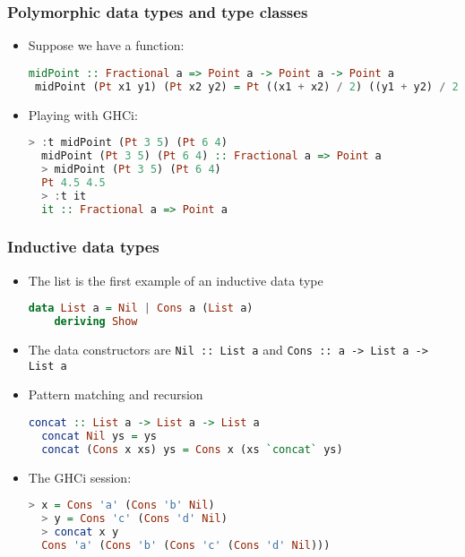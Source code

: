 \documentclass[10pt,pdf,utf8,russian,aspectratio=169]{beamer}
\begin{document}
\begin{frame}[fragile]
  \frametitle{Polymorphic data types and type classes}

\begin{itemize}
  \item Suppose we have a function:

  \begin{lstlisting}[language=Haskell]
 midPoint :: Fractional a => Point a -> Point a -> Point a
 midPoint (Pt x1 y1) (Pt x2 y2) = Pt ((x1 + x2) / 2) ((y1 + y2) / 2)
  \end{lstlisting}
  \item Playing with GHCi:
  \begin{lstlisting}[language=Haskell]
  > :t midPoint (Pt 3 5) (Pt 6 4)
  midPoint (Pt 3 5) (Pt 6 4) :: Fractional a => Point a
  > midPoint (Pt 3 5) (Pt 6 4)
  Pt 4.5 4.5
  > :t it
  it :: Fractional a => Point a
  \end{lstlisting}
\end{itemize}
\end{frame}

\begin{frame}[fragile]
  \frametitle{Inductive data types}

\begin{itemize}
  \item The list is the first example of an inductive data type

  \begin{lstlisting}[language=Haskell]
  data List a = Nil | Cons a (List a)
    deriving Show
  \end{lstlisting}
  \item The data constructors are \verb"Nil :: List a" and \verb"Cons :: a -> List a -> List a"
  \item Pattern matching and recursion
  \begin{lstlisting}[language=Haskell]
  concat :: List a -> List a -> List a
  concat Nil ys = ys
  concat (Cons x xs) ys = Cons x (xs `concat` ys)
  \end{lstlisting}
  \item The GHCi session:
  \begin{lstlisting}[language=Haskell]
  > x = Cons 'a' (Cons 'b' Nil)
  > y = Cons 'c' (Cons 'd' Nil)
  > concat x y
  Cons 'a' (Cons 'b' (Cons 'c' (Cons 'd' Nil)))
  \end{lstlisting}
\end{itemize}
\end{frame}
\end{document}
